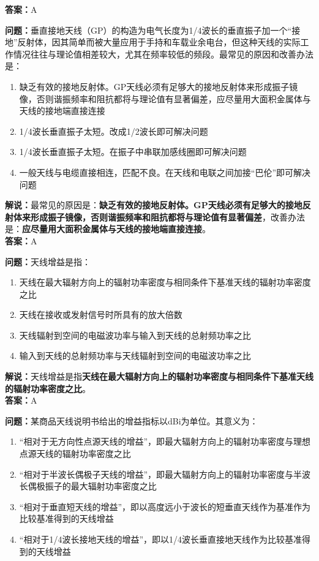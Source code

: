\textbf{答案：}A

\textbf{问题：}垂直接地天线（GP）的构造为电气长度为1/4波长的垂直振子加一个“接地”反射体，因其简单而被大量应用于手持和车载业余电台，但这种天线的实际工作情况往往与理论值相差较大，尤其在频率较低的频段。最常见的原因和改善办法是：

\begin{enumerate}[label=\Alph*), leftmargin=1cm]
	\item 缺乏有效的接地反射体。GP天线必须有足够大的接地反射体来形成振子镜像，否则谐振频率和阻抗都将与理论值有显著偏差，应尽量用大面积金属体与天线的接地端直接连接
	\item 1/4波长垂直振子太短。改成1/2波长即可解决问题
	\item 1/4波长垂直振子太短。在振子中串联加感线圈即可解决问题
	\item 一般天线与电缆直接相连，匹配不良。在天线和电联之间加接“巴伦”即可解决问题
\end{enumerate}

\textbf{解说：}最常见的原因是：\textbf{缺乏有效的接地反射体。GP天线必须有足够大的接地反射体来形成振子镜像，否则谐振频率和阻抗都将与理论值有显著偏差}，改善办法是：\textbf{应尽量用大面积金属体与天线的接地端直接连接}。\\\textbf{答案：}A



\textbf{问题：}天线增益是指：

\begin{enumerate}[label=\Alph*), leftmargin=1cm]
	\item 天线在最大辐射方向上的辐射功率密度与相同条件下基准天线的辐射功率密度之比
	\item 天线在接收或发射信号时所具有的放大倍数
	\item 天线辐射到空间的电磁波功率与输入到天线的总射频功率之比
	\item 输入到天线的总射频功率与天线辐射到空间的电磁波功率之比
\end{enumerate}

\textbf{解说：}天线增益是指\textbf{天线在最大辐射方向上的辐射功率密度与相同条件下基准天线的辐射功率密度之比}。\\\textbf{答案：}A



\textbf{问题：}某商品天线说明书给出的增益指标以dBi为单位。其意义为：
\begin{enumerate}[label=\Alph*), leftmargin=1cm]
	\item “相对于无方向性点源天线的增益”，即最大辐射方向上的辐射功率密度与理想点源天线的辐射功率密度之比
	\item “相对于半波长偶极子天线的增益”，即最大辐射方向上的辐射功率密度与半波长偶极振子的最大辐射功率密度之比
	\item “相对于垂直短天线的增益”，即以高度远小于波长的短垂直天线作为基准作为比较基准得到的天线增益
	\item “相对于1/4波长接地天线的增益”，即以1/4波长垂直接地天线作为比较基准得到的天线增益
\end{enumerate}

